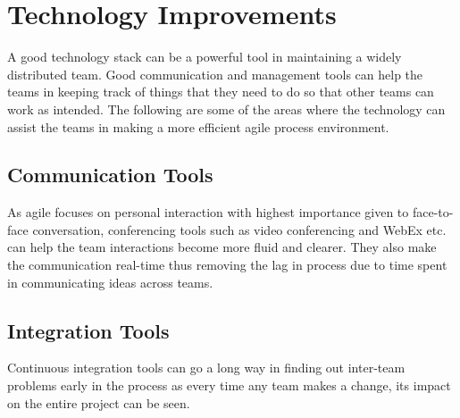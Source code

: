 \section{Technology Improvements} 
\label{sec:tech_impv}
	A good technology stack can be a powerful tool in maintaining a widely distributed team. Good communication and management tools can help the teams in keeping track of things that they need to do so that other teams can work as intended. The following are some of the areas where the technology can assist the teams in making a more efficient agile process environment.

\subsection{Communication Tools} As agile focuses on personal interaction with highest importance given to face-to-face conversation, conferencing tools such as video conferencing and WebEx etc. can help the team interactions become more fluid and clearer. They also make the communication real-time thus removing the lag in process due to time spent in communicating ideas across teams.

\subsection{Integration Tools} Continuous integration tools can go a long way in finding out inter-team problems early in the process as every time any team makes a change, its impact on the entire project can be seen.
